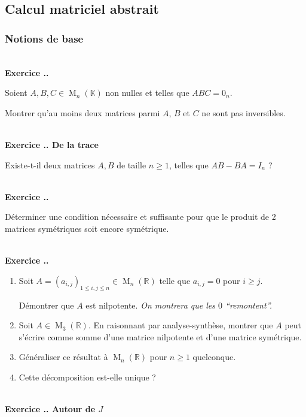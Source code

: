 \documentclass{article}
\newcommand{\mb}[1]{\mathbb{#1}}
\renewcommand{\M}{\operatorname{M}}
\newcounter{exo}
\newcommand{\exercice}[1][\null]{\textbf{\\ Exercice \thesection.\theexo. #1} \addtocounter{exo}{1}}
\begin{document}
\subsection{Calcul matriciel abstrait}

\subsubsection{Notions de base}


\exercice

Soient $A, B, C \in \M_n(\mb{K})$ non nulles et telles que $ABC = 0_n$.

Montrer qu'au moins deux matrices parmi $A$, $B$ et $C$ ne sont pas inversibles.

\exercice[De la trace]

Existe-t-il deux matrices $A,B$ de taille $n \ge 1$, telles que $AB - BA = I_n$ ?

\exercice

Déterminer une condition nécessaire et suffisante pour que le produit de 2 matrices symétriques soit encore symétrique.

\exercice

\begin{enumerate}

\item Soit $A = (a_{i,j})_{1 \le i,j \le n} \in \M_n(\mb{R})$ telle que $a_{i,j} = 0$ pour $i \ge j$.

Démontrer que $A$ est nilpotente. \emph{On montrera que les $0$ ``remontent''.}

\item Soit $A \in \M_3(\mb{R})$. En raisonnant par analyse-synthèse, montrer que $A$ peut s'écrire comme somme d'une matrice nilpotente et d'une matrice symétrique.

\item Généraliser ce résultat à $\M_n(\mb{R})$ pour $n \ge 1$ quelconque.

\item Cette décomposition est-elle unique ?

\end{enumerate}




\exercice[Autour de $J$]
\end{document}
